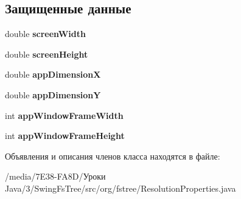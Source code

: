 \subsection*{Защищенные данные}
\begin{DoxyCompactItemize}
\item 
\hypertarget{classorg_1_1fstree_1_1_resolution_properties_a2e6a49ac7d174c31d6e1e65638de0d07}{
double {\bfseries screenWidth}}
\label{classorg_1_1fstree_1_1_resolution_properties_a2e6a49ac7d174c31d6e1e65638de0d07}

\item 
\hypertarget{classorg_1_1fstree_1_1_resolution_properties_a1769a66069ac4827381b2664c674995e}{
double {\bfseries screenHeight}}
\label{classorg_1_1fstree_1_1_resolution_properties_a1769a66069ac4827381b2664c674995e}

\item 
\hypertarget{classorg_1_1fstree_1_1_resolution_properties_a3040b2a6b774f2f9f4af9bd02b6b8c02}{
double {\bfseries appDimensionX}}
\label{classorg_1_1fstree_1_1_resolution_properties_a3040b2a6b774f2f9f4af9bd02b6b8c02}

\item 
\hypertarget{classorg_1_1fstree_1_1_resolution_properties_a6712bb46abdfc98e0bdb3179138c3389}{
double {\bfseries appDimensionY}}
\label{classorg_1_1fstree_1_1_resolution_properties_a6712bb46abdfc98e0bdb3179138c3389}

\item 
\hypertarget{classorg_1_1fstree_1_1_resolution_properties_ac06dbe2cb90254ceb6705328c36248f3}{
int {\bfseries appWindowFrameWidth}}
\label{classorg_1_1fstree_1_1_resolution_properties_ac06dbe2cb90254ceb6705328c36248f3}

\item 
\hypertarget{classorg_1_1fstree_1_1_resolution_properties_a1c830e804e6343706dda393e19605370}{
int {\bfseries appWindowFrameHeight}}
\label{classorg_1_1fstree_1_1_resolution_properties_a1c830e804e6343706dda393e19605370}

\end{DoxyCompactItemize}


Объявления и описания членов класса находятся в файле:\begin{DoxyCompactItemize}
\item 
/media/7E38-\/FA8D/Уроки Java/3/SwingFsTree/src/org/fstree/ResolutionProperties.java\end{DoxyCompactItemize}
